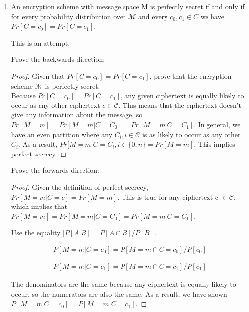 \documentclass{article}
\begin{document}
\begin{enumerate}
\begin{enumerate}
      \item An encryption scheme with message space M is perfectly secret if and 
        only if for every probability distribution over $\mathcal{M}$ and every
        $c_0, c_1 \in C$ 
        we have $Pr\left[C = c_0\right] = Pr\left[C = c_1\right]$.

        This is an attempt.

        Prove the backwards direction:

        \begin{proof}
        Given that $Pr\left[C = c_0\right] = Pr\left[C = c_1\right]$, prove that the encryption scheme $\mathcal{M}$ is perfectly secret.\\

        Because $Pr\left[C = c_0\right] = Pr\left[C = c_1\right]$, any given ciphertext is equally likely to occur as any other ciphertext $c \in \mathcal{C}$. This means that the ciphertext doesn't give any information about the message, so $Pr[M = m] = Pr[M = m | C = C_0] = Pr[M = m | C = C_1]$. In general, we have an even partition where any $C_i, i \in \mathcal{C}$ is as likely to occur as any other $C_i$. As a result, $Pr[M = m | C = C_i, i \in \{0, n\} = Pr[M = m]$. This implies perfect secrecy.
        \end{proof}

        Prove the forwards direction:

        \begin{proof}
        Given the definition of perfect secrecy,  $Pr[M = m | C = c] = Pr[M = m]$. This is true for any ciphertext c $\in \mathcal{C}$, which implies that $Pr[M = m] = Pr[M = m | C = C_0] = Pr[M = m | C = C_1]$.

        Use the equality $[P[A | B] = P[A \cap B] / P[B]$. 

        \begin{align*}
            P[M = m | C = c_0] = P[M = m \cap C = c_0] / P[c_0]
        \end{align*}

        \begin{align*}
            P[M = m | C = c_1] = P[M = m \cap C = c_1] / P[c_1]
        \end{align*}

        The denominators are the same because any ciphertext is equally likely to occur, so the numerators are also the same. As a result, we have shown $P[M = m | C = c_0] = P[M = m | C = c_1]$.
        
        \end{proof}
        

\end{enumerate}
\end{enumerate}
\end{document}
